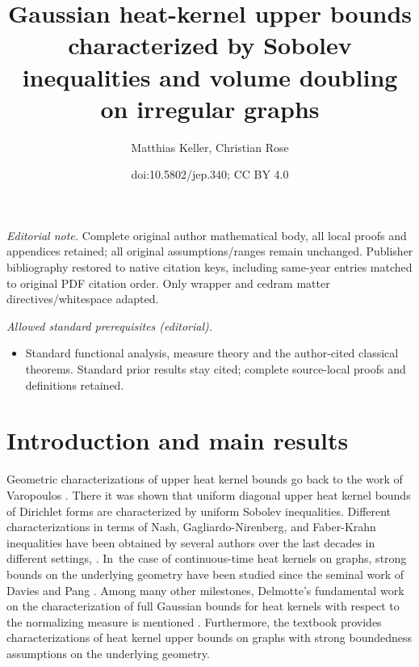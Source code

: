 \documentclass[10pt]{amsart}
\title{Gaussian heat-kernel upper bounds characterized by Sobolev inequalities and volume doubling on irregular graphs}
\author{Matthias Keller, Christian Rose}
\date{doi:10.5802/jep.340; CC BY 4.0}
\theoremstyle{plain}
\theoremstyle{definition}
\begin{document}
\maketitle
\noindent\textit{Editorial note.} Complete original author mathematical body, all local proofs and appendices retained; all original assumptions/ranges remain unchanged. Publisher bibliography restored to native citation keys, including same-year entries matched to original PDF citation order. Only wrapper and cedram matter directives/whitespace adapted.\par\medskip
\noindent\textit{Allowed standard prerequisites (editorial).}\begin{itemize}
\item Standard functional analysis, measure theory and the author-cited classical theorems. Standard prior results stay cited; complete source-local proofs and definitions retained.
\end{itemize}\medskip
\vspace*{-1.5\baselineskip}
\tableofcontents

\section{Introduction and main results}

Geometric characterizations of upper heat kernel bounds go back to the work of Varopoulos \cite{Varopoulos-85}. There it was shown that uniform diagonal upper heat kernel bounds of Dirichlet forms are characterized by uniform Sobolev inequalities. Different characterizations in terms of Nash, Gagliardo-Nirenberg, and Faber-Krahn inequalities have been obtained by several authors over the last decades in different settings, \cite{CarlenKS-87,Coulhon-92,SaloffCoste-92,Grigoryan-94,
SaloffCoste-92a,SaloffC-01,BCS, GrigoryanHH}. In~the case of continuous-time heat kernels on graphs, strong bounds on the underlying geometry have been studied since the seminal work of Davies and Pang \cite{Davies-93,Pang-93}.
Among many other milestones, Delmotte's fundamental work on the characterization of full Gaussian bounds for heat kernels with respect to the normalizing measure is mentioned \cite{Delmotte-99}. Furthermore, the textbook \cite{Barlow-book} provides characterizations of heat kernel upper bounds on graphs with strong boundedness assumptions on the underlying geometry.
\end{document}
